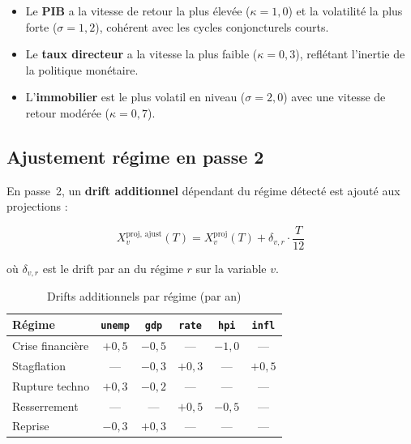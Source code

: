 \documentclass[12pt,a4paper]{article}
\begin{document}
\begin{interpretbox}
\begin{itemize}[nosep]
    \item Le \textbf{PIB} a la vitesse de retour la plus \'elev\'ee ($\kappa = 1{,}0$)
          et la volatilit\'e la plus forte ($\sigma = 1{,}2$), coh\'erent avec les cycles
          conjoncturels courts.
    \item Le \textbf{taux directeur} a la vitesse la plus faible ($\kappa = 0{,}3$),
          refl\'etant l'inertie de la politique mon\'etaire.
    \item L'\textbf{immobilier} est le plus volatil en niveau ($\sigma = 2{,}0$) avec
          une vitesse de retour mod\'er\'ee ($\kappa = 0{,}7$).
\end{itemize}
\end{interpretbox}

\subsection{Ajustement r\'egime en passe 2}

En passe~2, un \textbf{drift additionnel} d\'ependant du r\'egime d\'etect\'e est ajout\'e
aux projections :

\begin{equation}
    X_v^{\text{proj, ajust}}(T) = X_v^{\text{proj}}(T) + \delta_{v,r} \cdot \frac{T}{12}
    \label{eq:regime_drift}
\end{equation}

o\`u $\delta_{v,r}$ est le drift par an du r\'egime $r$ sur la variable $v$.

\begin{table}[htbp]
\centering
\caption{Drifts additionnels par r\'egime (par an)}
\begin{tabular}{lccccc}
\toprule
\textbf{R\'egime} & \texttt{unemp} & \texttt{gdp} & \texttt{rate} & \texttt{hpi} & \texttt{infl} \\
\midrule
Crise financi\`ere & $+0{,}5$ & $-0{,}5$ & --- & $-1{,}0$ & --- \\
Stagflation & --- & $-0{,}3$ & $+0{,}3$ & --- & $+0{,}5$ \\
Rupture techno & $+0{,}3$ & $-0{,}2$ & --- & --- & --- \\
Resserrement & --- & --- & $+0{,}5$ & $-0{,}5$ & --- \\
Reprise & $-0{,}3$ & $+0{,}3$ & --- & --- & --- \\
\bottomrule
\end{tabular}
\label{tab:regime_drifts}
\end{table}
\end{document}
